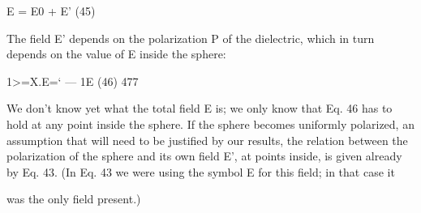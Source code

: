 \begin{equation}
\end{equation}
E = E0 + E' (45)

The field E' depends on the polarization P of the dielectric, which in
turn depends on the value of E inside the sphere:

\begin{equation}
\end{equation}
1>=X.E=‘ --- 1E (46)
477

We don't know yet what the total field E is; we only know that
Eq. 46 has to hold at any point inside the sphere. If the sphere becomes
uniformly polarized, an assumption that will need to be
justified by our results, the relation between the polarization of the
sphere and its own field E', at points inside, is given already by Eq. 43.
(In Eq. 43 we were using the symbol E for this field; in that case it

was the only field present.)


